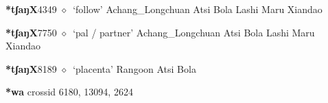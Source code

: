   \begin{list}{}{\leftmargin=1.5em \itemindent=-1.5em}
  \item {\footnotesize \textbf{*tʃaŋX}}{\tiny 4349}
         $\diamond$~`follow'
         Achang\_Longchuan 
\hspace{1ex}
         Atsi 
\hspace{1ex}
         Bola 
\hspace{1ex}
         Lashi 
\hspace{1ex}
         Maru 
\hspace{1ex}
         Xiandao 
  \item {\footnotesize \textbf{*tʃaŋX}}{\tiny 7750}
\hspace{1ex}
         $\diamond$~`pal / partner'
         Achang\_Longchuan 
\hspace{1ex}
         Atsi 
\hspace{1ex}
         Bola 
\hspace{1ex}
         Lashi 
\hspace{1ex}
         Maru 
\hspace{1ex}
         Xiandao 
  \item {\footnotesize \textbf{*tʃaŋX}}{\tiny 8189}
\hspace{1ex}
         $\diamond$~`placenta'
         Rangoon 
\hspace{1ex}
         Atsi 
\hspace{1ex}
         Bola 
  \end{list}
\item
\textbf{*wa}
  {\tiny crossid 6180, 13094, 2624}
